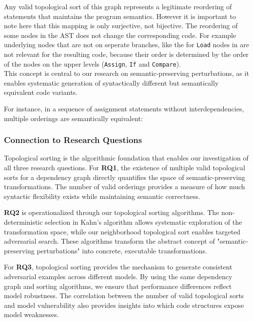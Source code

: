 \documentclass[%
thesis=student,%
coverpage=false,%
titlepage=false,%
headmarks=true, %
english,%
font=libertine, %
math=newpxtx, %
BCOR=5mm,%
coverBCOR=11mm%
]{tum-templates/book/tumbook}
\begin{document}
Any valid topological sort of this graph represents a legitimate reordering of statements that maintains the program semantics. However it is important to note here that this mapping is only surjective, not bijective. The reordering of some nodes in the AST does not change the corresponding code. For example underlying nodes that are not on seperate branches, like the for \texttt{Load} nodes in  are not relevant for the resulting code, because their order is determined by the order of the nodes on the upper levels (\texttt{Assign}, \texttt{If} and \texttt{Compare}). \\
This concept is central to our research on semantic-preserving perturbations, as it enables systematic generation of syntactically different but semantically equivalent code variants.

For instance, in a sequence of assignment statements without interdependencies, multiple orderings are semantically equivalent:

\subsubsection{Connection to Research Questions}

Topological sorting is the algorithmic foundation that enables our investigation of all three research questions. For \textbf{RQ1}, the existence of multiple valid topological sorts for a dependency graph directly quantifies the space of semantic-preserving transformations. The number of valid orderings provides a measure of how much syntactic flexibility exists while maintaining semantic correctness.

\textbf{RQ2} is operationalized through our topological sorting algorithms. The non-deterministic selection in Kahn's algorithm allows systematic exploration of the transformation space, while our neighborhood topological sort enables targeted adversarial search. These algorithms transform the abstract concept of "semantic-preserving perturbations" into concrete, executable transformations.

For \textbf{RQ3}, topological sorting provides the mechanism to generate consistent adversarial examples across different models. By using the same dependency graph and sorting algorithms, we ensure that performance differences reflect model robustness. The correlation between the number of valid topological sorts and model vulnerability also provides insights into which code structures expose model weaknesses.
\end{document}
